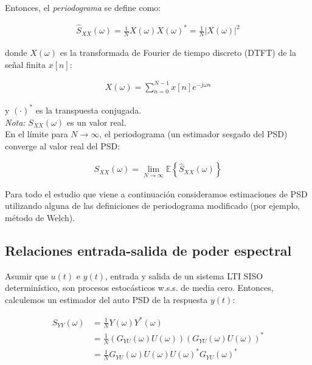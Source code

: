 Entonces, el \emph{periodograma} se define como: 

\begin{align*}
    \hat{S}_{XX}(\omega) = \frac{1}{N} X(\omega) X(\omega)^{*} = \frac{1}{N} |X(\omega)|^{2}
\end{align*}

\noindent donde $X(\omega)$ es la transformada de Fourier de tiempo discreto (DTFT) de la señal finita $x[n]$:

\begin{align*}
    X(\omega) = \sum_{n=0}^{N-1} x[n] e^{-j \omega n}
\end{align*}

\noindent y $(\cdot)^{*}$ es la transpuesta conjugada.\\

\emph{Nota:} $S_{XX}(\omega)$ es un valor real.\\

En el límite para $N\to\infty$, el periodograma (un estimador sesgado del PSD) converge al valor real del PSD:

\begin{align*}
    S_{XX}(\omega) = \lim_{N\to\infty} \mathbb{E} \left\{ \hat{S}_{XX}(\omega) \right\}
\end{align*}

Para todo el estudio que viene a continuación consideramos estimaciones de PSD utilizando alguna de las definiciones de periodograma modificado (por ejemplo, método de Welch). %

\subsection{Relaciones entrada-salida de poder espectral}

Asumir que $u(t)$ e $y(t)$, entrada y salida de un sistema LTI SISO determinístico, son procesos estocásticos w.s.s. de media cero. Entonces, calculemos un estimador del auto PSD de la respuesta $y(t)$:

\begin{align*}
    \hat{S}_{YY}(\omega) &= \frac{1}{N} Y(\omega)Y^{*} (\omega)\\\
    &= \frac{1}{N} \left( G_{YU}(\omega) U(\omega)\right) \left(G_{YU}(\omega) U(\omega)\right)^{*}\\
    &= \frac{1}{N} G_{YU}(\omega) U(\omega) U(\omega)^{*} G_{YU}(\omega)^{*}
\end{align*}

